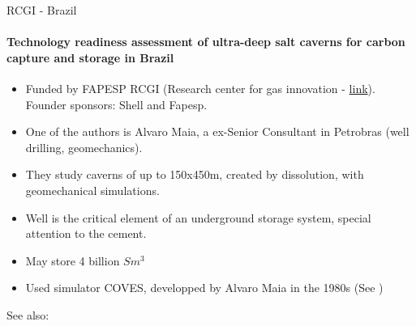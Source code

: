 %
%
\begin{frame}{RCGI - Brazil}
\framesubtitle{\cite{goulart20} Technology readiness assessment of ultra-deep salt caverns for carbon capture and storage in Brazil}
\begin{itemize}
\item Funded by FAPESP RCGI (Research center for gas innovation - \href{https://sites.usp.br/rcgi/br/rgci_br/}{link}). Founder sponsors: Shell and Fapesp.
\item One of the authors is Alvaro Maia, a ex-Senior Consultant in Petrobras (well drilling, geomechanics).
\item They study caverns of up to 150x450m, created by dissolution, with geomechanical simulations.
\item Well is the critical element of an underground storage system, special attention to the cement.
\item May store 4 billion $Sm^3$
\item Used simulator COVES, developped by Alvaro Maia in the 1980s (See \cite{maia1984})
\end{itemize}
See also: \cite{abreu23}
\end{frame}
%
%
%
%
